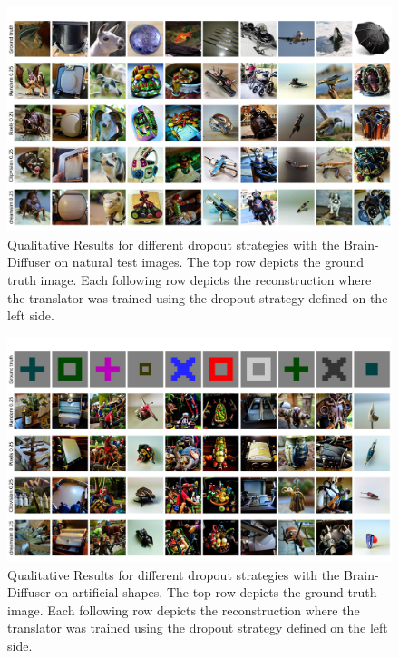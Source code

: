 \begin{figure}[H]
   \centering
   \includegraphics[width=1\textwidth]{plots/dropout_qual_eval_bd_test.JPEG}
   \caption[Experiment 1: Reconstructed images for Brain-Diffuser on natural test images]{Qualitative Results for different dropout strategies with the Brain-Diffuser on natural test images. The top row depicts the ground truth image. Each following row depicts the reconstruction where the translator was trained using the dropout strategy defined on the left side.}\label{fig:dropout_qual_eval_bd_test}
\end{figure}

\begin{figure}[H]
   \centering
   \includegraphics[width=1\textwidth]{plots/dropout_qual_eval_bd_art.JPEG}
   \caption[Experiment 1: Reconstructed images for Brain-Diffuser on artificial shapes]{Qualitative Results for different dropout strategies with the Brain-Diffuser on artificial shapes. The top row depicts the ground truth image. Each following row depicts the reconstruction where the translator was trained using the dropout strategy defined on the left side.}\label{fig:dropout_qual_eval_bd_art}
\end{figure}


